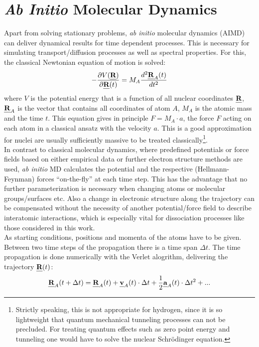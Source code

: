 \documentclass[11pt,DIV=13,BCOR=5mm,a4paper,headinclude]{scrbook}
\def\mathbi#1{\textbf{\em #1}}
\renewcommand{\vec}[1]{\mathbi{#1}}
\begin{document}
\section{\textit{Ab Initio} Molecular Dynamics}
Apart from solving stationary problems, \textit{ab initio} molecular dynamics (AIMD) can deliver dynamical results for time dependent processes\cite{jensen,marx_hutter_AIMD}.
This is necessary for simulating transport/diffusion processes as well as spectral properties.
For this, the classical Newtonian equation of motion is solved:
\begin{equation}
 -\frac{\partial V(\vec{R})}{\partial \vec{R}(t)}=M_A\frac{d^2 \vec{R}_A(t)}{dt^2}
\end{equation}
where $V$ is the potential energy that is a function of all nuclear coordinates $\vec{R}$, $\vec{R}_A$ is the vector that contains all coordinates of atom $A$, $M_A$ is the atomic mass  and the time $t$.
This equation gives in principle $F=M_A\cdot a$, the force $F$ acting on each atom in a classical ansatz with the velocity $a$.
This is a good approximation for nuclei are usually sufficiently massive to be treated classically\footnote{Strictly speaking, this is not appropriate for hydrogen, since it is so lightweight that quantum mechanical tunneling processes can not be precluded.
For treating quantum effects such as zero point energy and tunneling one would have to solve the nuclear Schrödinger equation.}.
\\
In contrast to classical molecular dynamics, where predefined potentials or force fields based on either empirical data or further electron structure methods are used, \textit{ab initio} MD calculates the potential and the respective (Hellmann-Feynman) forces ``on-the-fly'' at each time step.
This has the advantage that no further parameterization is necessary when changing atoms or molecular groups/surfaces etc. Also a change in electronic structure along the trajectory can be compensated without the necessity of another potential/force field to describe interatomic interactions, which is especially vital for dissociation processes like those considered in this work.
\\
As starting conditions, positions and momenta of the atoms have to be given.
Between two time steps of the propagation there is a time span $\Delta t$.
The time propagation is done numerically with the Verlet alogrithm\cite{verlet}, delivering the trajectory $\vec{R}(t)$:
\begin{equation}\label{eq:t+dt}
 \vec{R}_A(t+\Delta t) = \vec{R}_A(t) + \vec{v}_A(t)\cdot \Delta t + \frac{1}{2}\vec{a}_A(t)\cdot \Delta t^2 + ...
 \end{equation}
\end{document}
